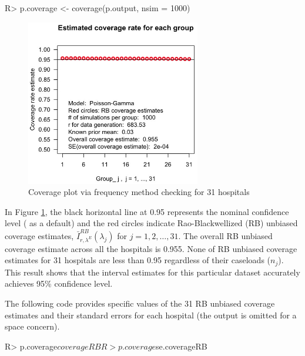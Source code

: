 \documentclass[article]{jss}
\begin{document}
\begin{CodeChunk}
\begin{CodeInput}
R> p.coverage <- coverage(p.output, nsim = 1000)
\end{CodeInput}
\end{CodeChunk}
\begin{figure}[h] 
\begin{center}
\includegraphics[width = 3in]{hospital2.png}
\caption{Coverage plot via frequency method checking for 31 hospitals}
\label{fig:hospitalcoverage}
\end{center}
\end{figure}

In Figure \ref{fig:hospitalcoverage}, the black horizontal line at 0.95 represents the nominal confidence level ( as a default) and the red circles indicate Rao-Blackwellized (RB) unbiased coverage estimates, $\bar{I}^{RB}_{r, \lambda^E}(\lambda_j)$ for $j=1, 2, \ldots, 31$. The overall RB unbiased coverage estimate across all the hospitals is 0.955. None of RB unbiased coverage estimates for 31 hospitals are less than 0.95 regardless of their caseloads ($n_{j}$). This result shows that the interval estimates for this particular dataset accurately achieves 95\% confidence level. 


The following code provides specific values of the 31 RB unbiased coverage estimates and their standard errors for each hospital (the output is omitted for a space concern).
\begin{CodeChunk}
\begin{CodeInput}
R> p.coverage$coverageRB
R> p.coverage$se.coverageRB
\end{CodeInput}
\end{CodeChunk}
\end{document}
